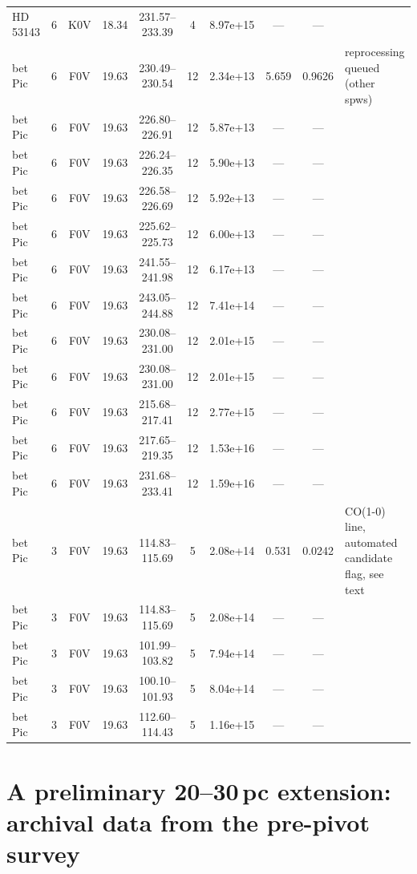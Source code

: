 \documentclass{openjournal}
\begin{document}
\begin{table}
\begin{tabularx}{\textwidth}{@{}l c c c c c c c c X@{}}
HD 53143 & 6 & K0V & 18.34 & 231.57--233.39 & 4 & 8.97e+15 & --- & --- &  \\
bet Pic & 6 & F0V & 19.63 & 230.49--230.54 & 12 & 2.34e+13 & 5.659 & 0.9626 & reprocessing queued (other spws) \\
bet Pic & 6 & F0V & 19.63 & 226.80--226.91 & 12 & 5.87e+13 & --- & --- &  \\
bet Pic & 6 & F0V & 19.63 & 226.24--226.35 & 12 & 5.90e+13 & --- & --- &  \\
bet Pic & 6 & F0V & 19.63 & 226.58--226.69 & 12 & 5.92e+13 & --- & --- &  \\
bet Pic & 6 & F0V & 19.63 & 225.62--225.73 & 12 & 6.00e+13 & --- & --- &  \\
bet Pic & 6 & F0V & 19.63 & 241.55--241.98 & 12 & 6.17e+13 & --- & --- &  \\
bet Pic & 6 & F0V & 19.63 & 243.05--244.88 & 12 & 7.41e+14 & --- & --- &  \\
bet Pic & 6 & F0V & 19.63 & 230.08--231.00 & 12 & 2.01e+15 & --- & --- &  \\
bet Pic & 6 & F0V & 19.63 & 230.08--231.00 & 12 & 2.01e+15 & --- & --- &  \\
bet Pic & 6 & F0V & 19.63 & 215.68--217.41 & 12 & 2.77e+15 & --- & --- &  \\
bet Pic & 6 & F0V & 19.63 & 217.65--219.35 & 12 & 1.53e+16 & --- & --- &  \\
bet Pic & 6 & F0V & 19.63 & 231.68--233.41 & 12 & 1.59e+16 & --- & --- &  \\
bet Pic & 3 & F0V & 19.63 & 114.83--115.69 & 5 & 2.08e+14 & 0.531 & 0.0242 & CO(1-0) line, automated candidate flag, see text \\
bet Pic & 3 & F0V & 19.63 & 114.83--115.69 & 5 & 2.08e+14 & --- & --- &  \\
bet Pic & 3 & F0V & 19.63 & 101.99--103.82 & 5 & 7.94e+14 & --- & --- &  \\
bet Pic & 3 & F0V & 19.63 & 100.10--101.93 & 5 & 8.04e+14 & --- & --- &  \\
bet Pic & 3 & F0V & 19.63 & 112.60--114.43 & 5 & 1.16e+15 & --- & --- &  \\
\hline
\end{tabularx}
\end{table}

\section{A preliminary 20--30\,pc extension: archival data from the pre-pivot survey}
\label{app:2030pc}
\end{document}
